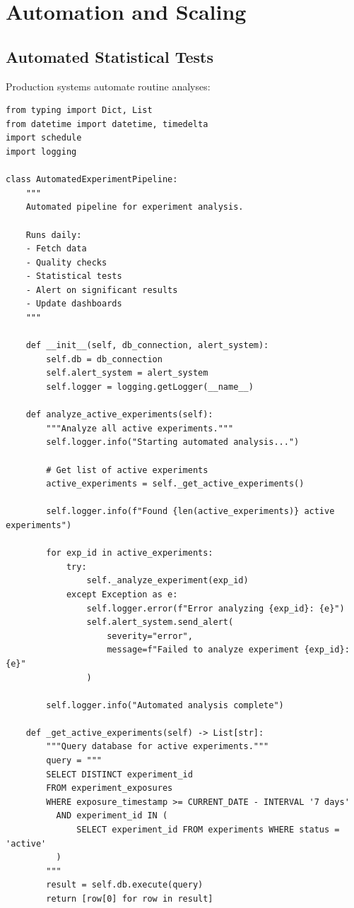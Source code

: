 \section{Automation and Scaling}

\subsection{Automated Statistical Tests}

Production systems automate routine analyses:

\lstset{language=Python, caption=Automated Experiment Analysis Pipeline}
\begin{lstlisting}
from typing import Dict, List
from datetime import datetime, timedelta
import schedule
import logging

class AutomatedExperimentPipeline:
    """
    Automated pipeline for experiment analysis.

    Runs daily:
    - Fetch data
    - Quality checks
    - Statistical tests
    - Alert on significant results
    - Update dashboards
    """

    def __init__(self, db_connection, alert_system):
        self.db = db_connection
        self.alert_system = alert_system
        self.logger = logging.getLogger(__name__)

    def analyze_active_experiments(self):
        """Analyze all active experiments."""
        self.logger.info("Starting automated analysis...")

        # Get list of active experiments
        active_experiments = self._get_active_experiments()

        self.logger.info(f"Found {len(active_experiments)} active experiments")

        for exp_id in active_experiments:
            try:
                self._analyze_experiment(exp_id)
            except Exception as e:
                self.logger.error(f"Error analyzing {exp_id}: {e}")
                self.alert_system.send_alert(
                    severity="error",
                    message=f"Failed to analyze experiment {exp_id}: {e}"
                )

        self.logger.info("Automated analysis complete")

    def _get_active_experiments(self) -> List[str]:
        """Query database for active experiments."""
        query = """
        SELECT DISTINCT experiment_id
        FROM experiment_exposures
        WHERE exposure_timestamp >= CURRENT_DATE - INTERVAL '7 days'
          AND experiment_id IN (
              SELECT experiment_id FROM experiments WHERE status = 'active'
          )
        """
        result = self.db.execute(query)
        return [row[0] for row in result]


\end{lstlisting}
